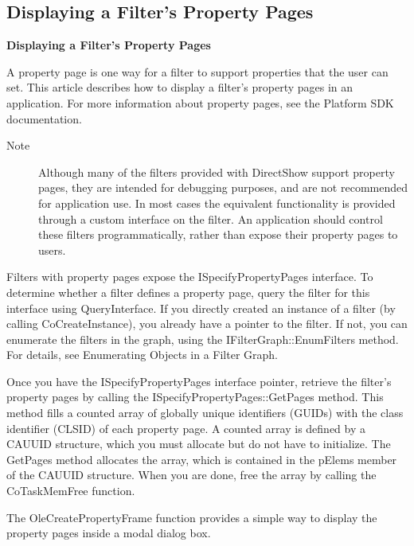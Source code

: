 \subsection{Displaying a Filter's Property Pages}
\textbf{Displaying a Filter's Property Pages}

A property page is one way for a filter to support properties that the user can set. This article describes how to display a filter's property pages in an application. For more information about property pages, see the Platform SDK documentation.

\begin{description}
	\item[Note]  Although many of the filters provided with DirectShow support property pages, they are intended for debugging purposes, and are not recommended for application use. In most cases the equivalent functionality is provided through a custom interface on the filter. An application should control these filters programmatically, rather than expose their property pages to users.
\end{description}

Filters with property pages expose the ISpecifyPropertyPages interface. To determine whether a filter defines a property page, query the filter for this interface using QueryInterface.
If you directly created an instance of a filter (by calling CoCreateInstance), you already have a pointer to the filter. If not, you can enumerate the filters in the graph, using the IFilterGraph::EnumFilters method. For details, see Enumerating Objects in a Filter Graph.

Once you have the ISpecifyPropertyPages interface pointer, retrieve the filter's property pages by calling the ISpecifyPropertyPages::GetPages method. This method fills a counted array of globally unique identifiers (GUIDs) with the class identifier (CLSID) of each property page. A counted array is defined by a CAUUID structure, which you must allocate but do not have to initialize. The GetPages method allocates the array, which is contained in the pElems member of the CAUUID structure. When you are done, free the array by calling the CoTaskMemFree function.

The OleCreatePropertyFrame function provides a simple way to display the property pages inside a modal dialog box.

